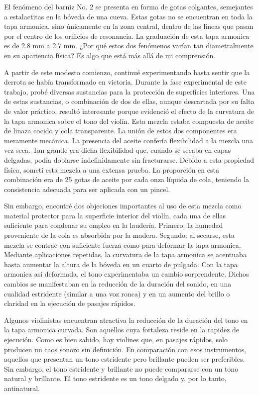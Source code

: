 \documentclass[12pt]{book}
\begin{document}
El fenómeno del barniz No. 2 se presenta en forma de gotas colgantes, semejantes a estalactitas en la bóveda de una cueva. Estas gotas no se encuentran en toda la tapa armonica, sino únicamente en la zona central, dentro de las líneas que pasan por el centro de los orificios de resonancia. La graduación de esta tapa armonica es de 2.8 mm a 2.7 mm. ¿Por qué estos dos fenómenos varían tan diametralmente en su apariencia física? Es algo que está más allá de mi comprensión.

A partir de este modesto comienzo, continué experimentando hasta sentir que la derrota se había transformado en victoria. Durante la fase experimental de este trabajo, probé diversas sustancias para la protección de superficies interiores. Una de estas sustancias, o combinación de dos de ellas, aunque descartada por su falta de valor práctico, resultó interesante porque evidenció el efecto de la curvatura de la tapa armonica sobre el tono del violín. Esta mezcla estaba compuesta de aceite de linaza cocido y cola transparente. La unión de estos dos componentes era meramente mecánica. La presencia del aceite confería flexibilidad a la mezcla una vez seca. Tan grande era dicha flexibilidad que, cuando se secaba en capas delgadas, podía doblarse indefinidamente sin fracturarse. Debido a esta propiedad física, sometí esta mezcla a una extensa prueba. La proporción en esta combinación era de 25 gotas de aceite por cada onza líquida de cola, teniendo la consistencia adecuada para ser aplicada con un pincel.

Sin embargo, encontré dos objeciones importantes al uso de esta mezcla como material protector para la superficie interior del violín, cada una de ellas suficiente para condenar su empleo en la laudería. Primero: la humedad proveniente de la cola es absorbida por la madera. Segundo: al secarse, esta mezcla se contrae con suficiente fuerza como para deformar la tapa armonica. Mediante aplicaciones repetidas, la curvatura de la tapa armonica se acentuaba hasta aumentar la altura de la bóveda en un cuarto de pulgada. Con la tapa armonica así deformada, el tono experimentaba un cambio sorprendente. Dichos cambios se manifestaban en la reducción de la duración del sonido, en una cualidad estridente (similar a una voz ronca) y en un aumento del brillo o claridad en la ejecución de pasajes rápidos.

Algunos violinistas encuentran atractiva la reducción de la duración del tono en la tapa armonica curvada. Son aquellos cuya fortaleza reside en la rapidez de ejecución. Como es bien sabido, hay violines que, en pasajes rápidos, solo producen un caos sonoro sin definición. En comparación con esos instrumentos, aquellos que presentan un tono estridente pero brillante pueden ser preferibles. Sin embargo, el tono estridente y brillante no puede compararse con un tono natural y brillante. El tono estridente es un tono delgado y, por lo tanto, antinatural.
\end{document}

